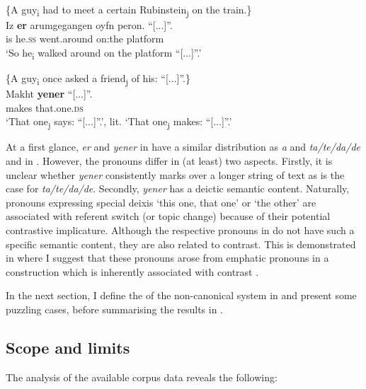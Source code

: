 \documentclass[output=paper
,newtxmath
,modfonts
,nonflat]{langsci/langscibook}
\begin{document}
\ea\label{ex:apel:20}
{ \citep[311]{Prince2006}}\\
\ea\label{ex:apel:20a}
{\{A guy\textsubscript{i} had to meet a certain Rubinstein\textsubscript{j} on the train.\}}\\
\gll Iz \textbf{er} arumgegangen oyfn peron. “[...]”.\\
     is he.\textsc{ss} went.around on:the platform \\
\glt ‘So he\textsubscript{i} walked around on the platform “[...]”.’

\ex\label{ex:apel:20b}
{\{A guy\textsubscript{i} once asked a friend\textsubscript{j} of his: “[...]”.\}}\\
\gll Makht \textbf{yener} “[...]”.\\
     makes that.one.\textsc{ds} \\
\glt ‘That one\textsubscript{j} says: “[...]”.’, lit. ‘That one\textsubscript{j} makes: “[...]”.’
\z
\z

At a first glance, \textit{er} and \textit{yener} in  have a similar distribution as \textit{a} and \textit{ta/te/da/de} and in . However, the  pronouns differ in (at least) two aspects. Firstly, it is unclear whether \textit{yener} consistently marks  over a longer string of text as is the case for \textit{ta/te/da/de}. Secondly, \textit{yener} has a deictic semantic content. Naturally, pronouns expressing special deixis ‘this one, that one’ or ‘the other’ are associated with referent switch (or topic change) because of their potential contrastive implicature. Although the respective pronouns in  do not have such a specific semantic content, they are also related to contrast. This is demonstrated in  where I suggest that these pronouns arose from emphatic pronouns in a  construction which is inherently associated with contrast \citep[153]{Givon76}.

In the next section, I define the  of the non-canonical  system in  and present some puzzling cases, before summarising the results in . 

\subsection{Scope and limits}\label{sec:apel:3.2}

The analysis of the available corpus data reveals the following: 
\end{document}
